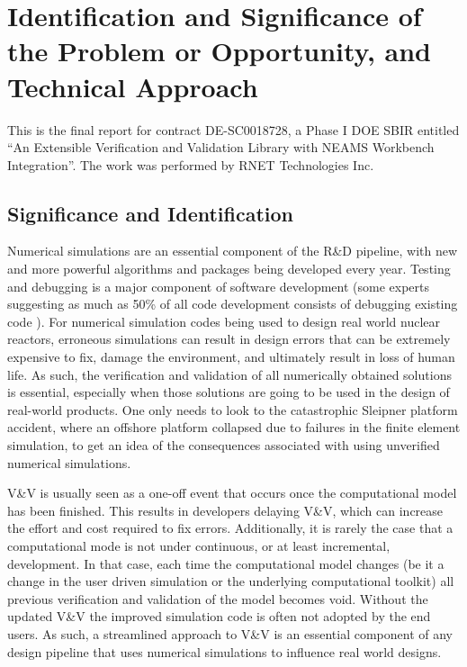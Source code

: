 \section{Identification and Significance of the Problem or Opportunity, and Technical Approach}

This is the final report for contract DE-SC0018728, a Phase I DOE SBIR
entitled ``An Extensible Verification and Validation Library with NEAMS Workbench Integration''. The work was performed by RNET Technologies 
Inc. 

\subsection{Significance and Identification}
\label{intro} 
Numerical simulations are an essential component of the R\&D pipeline, with new and more powerful algorithms and packages being developed every year. Testing and debugging is a major component of software development (some experts suggesting as much as 50\% of all code development consists of debugging existing code \cite{britton_debugging}). For numerical simulation codes being used to design real world nuclear reactors, erroneous simulations can result in design errors that can be extremely expensive to fix, damage the environment, and ultimately result in loss of human life. As such, the verification and validation of all numerically obtained solutions is essential, especially when those solutions are going to be used in the design of real-world products. One only needs to look to the catastrophic Sleipner platform accident, where an offshore platform collapsed due to failures in the finite element simulation, to get an idea of the consequences associated with using unverified numerical simulations. 

V\&V is usually seen as a one-off event that occurs once the computational model has been finished. This results in developers delaying V\&V, which can increase the effort and cost required to fix errors. Additionally, it is rarely the case that a computational mode is not under continuous, or at least incremental, development. In that case, each time the computational model changes (be it  a change in the user driven simulation or the underlying computational toolkit) all previous verification and validation of the model becomes void. Without the updated V\&V the improved simulation code is often not adopted by the end users. As such, a streamlined approach to V\&V is an essential component of any design pipeline that uses numerical simulations to influence real world designs.


